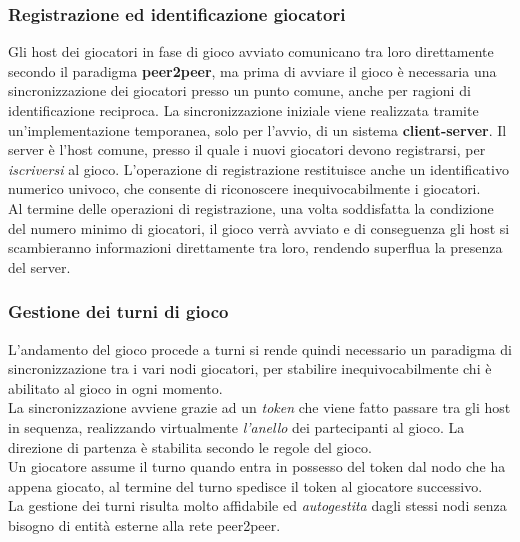 \documentclass[10pt,a4paper]{article}
\begin{document}
\subsubsection{Registrazione ed identificazione giocatori}
Gli host dei giocatori in fase di gioco avviato comunicano tra loro direttamente secondo il paradigma \textbf{peer2peer}, ma prima di avviare il gioco è necessaria una sincronizzazione dei giocatori presso un punto comune, anche per ragioni di identificazione reciproca. La sincronizzazione iniziale viene realizzata tramite un'implementazione temporanea, solo per l'avvio, di un sistema \textbf{client-server}. Il server è l'host comune, presso il quale i nuovi giocatori devono registrarsi, per \textit{iscriversi} al gioco. L'operazione di registrazione restituisce anche un identificativo numerico univoco, che consente di riconoscere inequivocabilmente i giocatori. \\ Al termine delle operazioni di registrazione, una volta soddisfatta la condizione del numero minimo di giocatori, il gioco verrà avviato e di conseguenza gli host si scambieranno informazioni direttamente tra loro, rendendo superflua la presenza del server.

\subsubsection{Gestione dei turni di gioco}
L'andamento del gioco procede a turni si rende quindi necessario un paradigma di sincronizzazione tra i vari nodi giocatori, per stabilire inequivocabilmente chi è abilitato al gioco in ogni momento.\\ La sincronizzazione avviene grazie ad un \textit{token} che viene fatto passare tra gli host in sequenza, realizzando virtualmente \textit{l'anello} dei partecipanti al gioco. La direzione di partenza è stabilita secondo le regole del gioco.\\ Un giocatore assume il turno quando entra in possesso del token dal nodo che ha appena giocato, al termine del turno spedisce il token al giocatore successivo.\\ 
La gestione dei turni risulta molto affidabile ed \textit{autogestita} dagli stessi nodi senza bisogno di entità esterne alla rete peer2peer.
\end{document}
